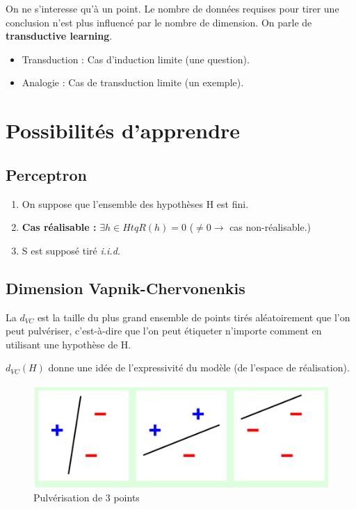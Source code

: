 \documentclass{article}
\begin{document}
On ne s'interesse qu'à un point. Le nombre de données requises pour tirer une conclusion n'est plus influencé par le nombre de dimension. On parle de \textbf{transductive learning}.
\begin{itemize}
\item Transduction : Cas d'induction limite (une question).
\item Analogie : Cas de transduction limite (un exemple).
\end{itemize}

\section{Possibilités d'apprendre}

\subsection{Perceptron}

\begin{enumerate}
\item On suppose que l'ensemble des hypothèses H est fini.
\item \textbf{Cas réalisable :} $ \exists h \in H tq R(h) = 0 $ ($ \ne 0 \rightarrow$ cas non-réalisable.)
\item S est supposé tiré \textit{i.i.d.}
\end{enumerate}


\subsection{Dimension Vapnik-Chervonenkis}

La $d_{VC}$ est la taille du plus grand ensemble de points tirés aléatoirement que l'on peut pulvériser, c'est-à-dire que l'on peut étiqueter n'importe comment en utilisant une hypothèse de H.

$d_{VC}(H)$ donne une idée de l'expressivité du modèle (de l'espace de réalisation).

\begin{figure}[H]
  \centering
  \includegraphics[scale=0.4]{dimension_vc1.png}
  \caption{Pulvérisation de 3 points}
\end{figure}
\end{document}
